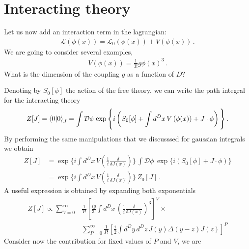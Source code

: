 \documentclass[notes]{subfiles}
\begin{document}
  \section{Interacting theory}
  \label{sec:interacting-theory}

  Let us now add an interaction term in the lagrangian:
  \begin{align}
    \mathcal{L}\left(\phi(x)\right) = 
    \mathcal{L}_0\left(\phi(x)\right) + V\left(\phi(x)\right)\, .
  \end{align}
  We are going to consider several examples, \eg
  \begin{align}
    V\left(\phi(x)\right) = \frac{1}{3!} g \phi(x)^3\, .
  \end{align}
  What is the dimension of the coupling $g$ as a function of $D$?

  Denoting by $S_0[\phi]$ the action of the free theory, we can write
  the path integral for the interacting theory
  \begin{align}
    Z[J] = \braket{0}{0}_J = \int \mathcal{D}\phi\, 
    \exp\Bigg\{i \left( S_0[\phi] + \int d^Dx\,  V\left(\phi(x)\right) 
    + J \cdot \phi \right) \Bigg\}\, .
  \end{align}
  By performing the same manipulations that we discusssed for 
  gaussian integrals we obtain
  \begin{align}
    Z[J] &= \exp \Bigg\{i \int d^Dx\,  
          V\left(\frac{1}{i}\frac{\delta}{\delta J(x)}\right) \Bigg\}\, 
          \int \mathcal{D}\phi\, 
          \exp\Bigg\{i \left( S_0[\phi]  
          + J \cdot \phi \right) \Bigg\} \\
        &= \exp \Bigg\{i \int d^Dx\,  
          V\left(\frac{1}{i}\frac{\delta}{\delta J(x)}\right) \Bigg\}\, 
          Z_0[J]\, .
  \end{align}
  A useful expression is obtained by expanding both exponentials
  \begin{align}
    Z[J] \propto 
    \sum_{V=0}^\infty & \frac{1}{V!} \left[
                        \frac{i g}{3!} \int d^Dx\, 
                        \left(\frac{1}{i}\frac{\delta}{\delta J(x)}\right)^3
                        \right]^V \times \\
    \label{eq:DoubleExpExp}
                      & \sum_{P=0}^\infty \frac{1}{P!} \left[
                        \frac{i}{2} \int d^Dy\, d^Dz\, 
                        J(y) \Delta(y-z) J(z)
                        \right]^P
  \end{align}
  Consider now the contribution for fixed values of $P$ and $V$, we are
\end{document}
